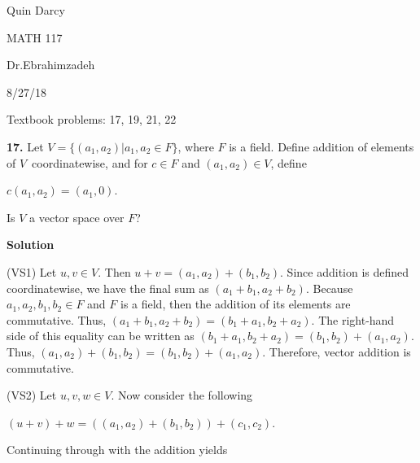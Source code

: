 \documentclass[12pt, a4paper]{article}
\begin{document}
Quin Darcy\par
MATH 117\par
Dr.Ebrahimzadeh\par
8/27/18\par

\vspace{4mm}

\centerline{Textbook problems: 17, 19, 21, 22}

\vspace{4mm}

\begin{description}


\item\textbf{17. } Let $V=\{(a_1,a_2)|a_1,a_2\in F\}$, where $F$ is a field. Define addition of elements of $V$\ coordinatewise, and for $c\in F$ and $(a_1,a_2)\in V$, define

\vspace{2mm}

\centerline{$c(a_1,a_2)=(a_1,0)$.}

\vspace{2mm}

\par Is $V$ a vector space over $F$?

\vspace{4mm}

\textbf{Solution}

\vspace{4mm}

(VS1) Let $u,v\in V$. Then $u+v=(a_1,a_2)+(b_1,b_2)$. Since addition is defined coordinatewise, we have the final sum as $(a_1+b_1,a_2+b_2)$. Because $a_1,a_2,b_1,b_2\in F$ and $F$ is a field, then the addition of its elements are commutative. Thus, $(a_1+b_1,a_2+b_2)=(b_1+a_1,b_2+a_2)$. The right-hand side of this equality can be written as $(b_1+a_1,b_2+a_2)=(b_1,b_2)+(a_1,a_2)$. Thus, $(a_1,a_2)+(b_1,b_2)=(b_1,b_2)+(a_1,a_2)$. Therefore, vector addition is commutative.

\vspace{4mm}

(VS2) Let $u,v,w\in V$. Now consider the following\par

\vspace{4mm}

\centerline{$(u+v)+w=((a_1,a_2)+(b_1,b_2))+(c_1,c_2)$.}

\vspace{4mm}

Continuing through with the addition yields\par


\end{description}
\end{document}
